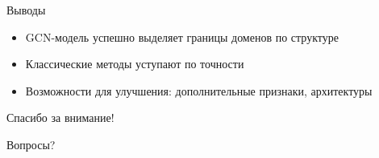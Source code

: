 \documentclass{beamer}
\begin{document}
\begin{frame}{Выводы}
  \begin{itemize}
    \item GCN-модель успешно выделяет границы доменов по структуре
    \item Классические методы уступают по точности
    \item Возможности для улучшения: дополнительные признаки, архитектуры
  \end{itemize}
\end{frame}

\begin{frame}{Спасибо за внимание!}
  \begin{center}
    Вопросы?
  \end{center}
\end{frame}
\end{document}
